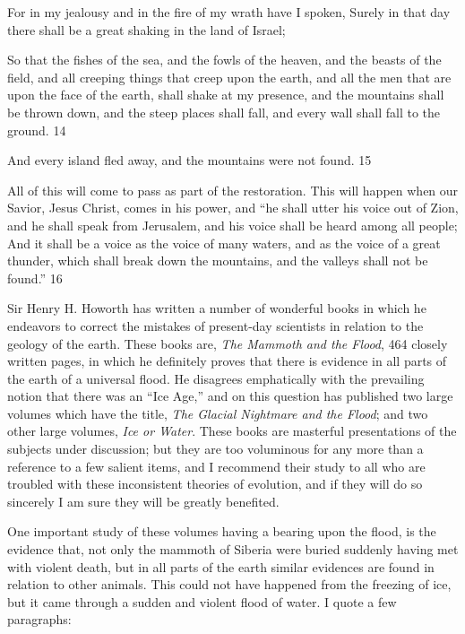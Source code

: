For in my jealousy and in the fire of my wrath have I spoken, Surely in that day there shall be
a great shaking in the land of Israel;

So that the fishes of the sea, and the fowls of the heaven, and the beasts of the field, and all
creeping things that creep upon the earth, and all the men that are upon the face of the earth,
shall shake at my presence, and the mountains shall be thrown down, and the steep places
shall fall, and every wall shall fall to the ground. 14

And every island fled away, and the mountains were not found. 15

All of this will come to pass as part of the restoration. This will happen when our Savior,
Jesus Christ, comes in his power, and ``he shall utter his voice out of Zion, and he shall speak
from Jerusalem, and his voice shall be heard among all people; And it shall be a voice as the
voice of many waters, and as the voice of a great thunder, which shall break down the
mountains, and the valleys shall not be found.'' 16

Sir Henry H. Howorth has written a number of wonderful books in which he endeavors to
correct the mistakes of present-day scientists in relation to the geology of the earth. These
books are, \textit{The Mammoth and the Flood}, 464 closely written pages, in which he definitely
proves that there is evidence in all parts of the earth of a universal flood. He disagrees
emphatically with the prevailing notion that there was an ``Ice Age,'' and on this question has
published two large volumes which have the title, \textit{The Glacial Nightmare and the Flood}; and
two other large volumes, \textit{Ice or Water}. These books are masterful presentations of the
subjects under discussion; but they are too voluminous for any more than a reference to a few
salient items, and I recommend their study to all who are troubled with these inconsistent
theories of evolution, and if they will do so sincerely I am sure they will be greatly benefited.

One important study of these volumes having a bearing upon the flood, is the evidence that,
not only the mammoth of Siberia were buried suddenly having met with violent death, but in
all parts of the earth similar evidences are found in relation to other animals. This could not
have happened from the freezing of ice, but it came through a sudden and violent flood of
water. I quote a few paragraphs:

